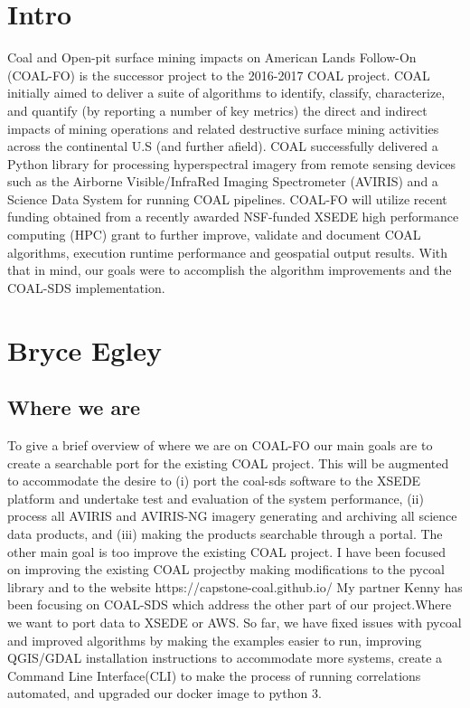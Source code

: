 \documentclass[onecolumn, draftclsnofoot,10pt, compsoc]{IEEEtran}
\begin{document}
\section{Intro}

Coal and Open-pit surface mining impacts on American Lands Follow-On (COAL-FO) is the successor project to the 2016-2017 COAL project. COAL initially aimed to deliver a suite of algorithms to identify, classify, characterize, and quantify (by reporting a number of key metrics) the direct and indirect impacts of mining operations and related destructive surface mining activities across the continental U.S (and further afield). COAL successfully delivered a Python library for processing hyperspectral imagery from remote sensing devices such as the Airborne Visible/InfraRed Imaging Spectrometer (AVIRIS) and a Science Data System for running COAL pipelines. COAL-FO will utilize recent funding obtained from a recently awarded NSF-funded XSEDE high performance computing (HPC) grant to further improve, validate and document COAL algorithms, execution runtime performance and geospatial output results. With that in mind, our goals were to accomplish the algorithm improvements and the COAL-SDS implementation.

\section{Bryce Egley}
\subsection{Where we are}
To give a brief overview of where we are on COAL-FO our main goals are to create a searchable port for the existing COAL project. This will be augmented to accommodate the desire to (i) port the coal-sds software to the XSEDE platform and undertake test and evaluation of the system performance, (ii) process all AVIRIS and AVIRIS-NG imagery generating and archiving all science data products, and (iii) making the products searchable through a portal. The other main goal is too improve the existing COAL project. I have been focused on improving the existing COAL projectby making modifications to the pycoal library and to the website https://capstone-coal.github.io/ My partner Kenny has been focusing on COAL-SDS which address the other part of our project.Where we want to port data to XSEDE or AWS.
So far, we have fixed issues with pycoal and improved algorithms by making the examples easier to run, improving QGIS/GDAL installation instructions to accommodate more systems, create a Command Line Interface(CLI) to make the process of running correlations automated, and upgraded our docker image to python 3.
\end{document}

